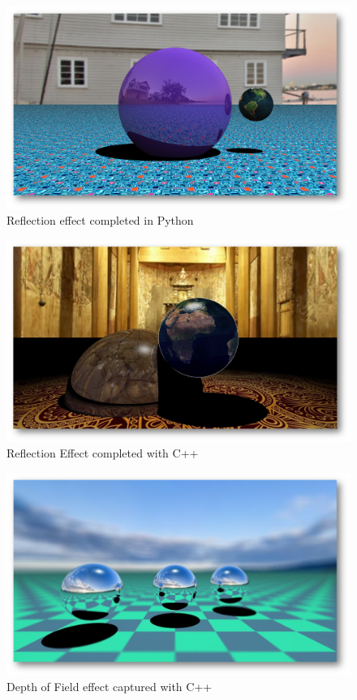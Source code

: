 \begin{figure}[ht]
\centering
\includegraphics[width=\textwidth]{figures/python-reflection.png}
\caption{Reflection effect completed in Python}
\label{fig:pyFlect}
\end{figure}
\begin{figure}[ht]
\centering
\includegraphics[width=\textwidth]{figures/c++-reflective.jpg}
\caption{Reflection Effect completed with C++}
\label{fig:c++Flect}
\end{figure}
\begin{figure}[ht]
\centering
\includegraphics[width=\textwidth]{figures/c++-distributed.jpg}
\caption{Depth of Field effect captured with C++}
\label{fig:c++Dist}
\end{figure}
